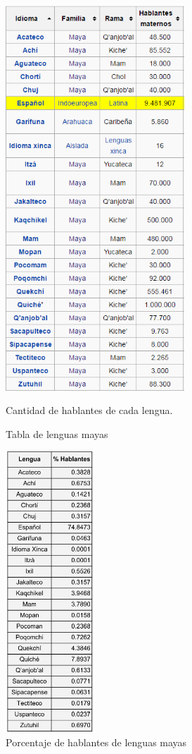 \documentclass[a4paper,openright,11pt]{article}
\begin{document}
\begin{figure}[H]
	\centering
	\includegraphics[width=0.6\textwidth]{tablalenguas}
	\caption{Tabla de lenguas mayas}
	Cantidad de hablantes de cada lengua.
	\label{fig:tabla}
\end{figure}

\begin{figure}[H]
	\centering
	\includegraphics[width=0.3\textwidth]{porhablantes}
	\caption{Porcentaje de hablantes de lenguas mayas}
	\label{fig:porc}
\end{figure}
\end{document}
